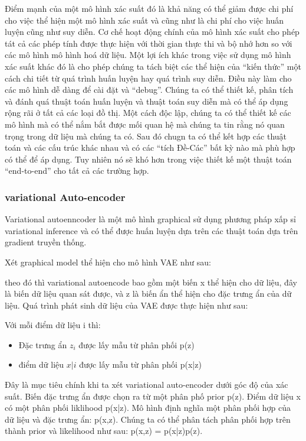         Điểm mạnh của một mô hình xác suất đó là khả năng có thể giảm được chi phí cho việc thể hiện một mô hình xác suất và cũng như là chi phí cho việc huấn luyện cũng như suy diễn. Cơ chế hoạt động chính của mô hình xác suất cho phép tát cả các phép tính được thực hiện với thời gian thực thi và bộ nhớ hơn so với các mô hình mô hình hoá dữ liệu. Một lợi ích khác trong việc sử dụng mô hình xác suất khác đó là cho phép chúng ta tách biệt các thể hiện của ``kiến thức'' một cách chi tiết từ quá trình huấn luyện hay quá trình suy diễn. Điều này làm cho các mô hình dễ dàng để cài đặt và ``debug''. Chúng ta có thể thiết kế, phân tích và đánh quá thuật toán huấn luyện và thuật toán suy diễn mà có thể áp dụng rộng rãi ở tất cả các loại đồ thị. Một cách độc lập, chúng ta có thể thiết kế các mô hình mà có thể nắm bắt được mối quan hệ mà chúng ta tin rằng nó quan trọng trong dữ liệu mà chúng ta có. Sau đó chugn ta có thể kết hợp các thuật toán và các cấu trúc khác nhau và có các ``tích Đề-Các'' bất kỳ nào mà phù hợp có thể để áp dụng. Tuy nhiên nó sẽ khó hơn trong việc thiết kế một thuật toán ``end-to-end'' cho tất cả các trường hợp.
        \subsubsection{variational Auto-encoder}
        Variational autoenncoder là một mô hình graphical sử dụng phương pháp xấp sỉ variational inference và có thể được huấn luyện dựa trên các thuật toán dựa trên gradient truyền thống.
        
        Xét graphical model thể hiện cho mô hình VAE như sau:

        theo đó thì variational autoencode bao gồm một biến x thể hiện cho dữ liệu, đây là biến dữ liệu quan sát được, và z là biến ẩn thể hiện cho đặc trưng ẩn của dữ liệu. 
        Quá trình phát sinh dữ liệu của VAE được thực hiện như sau: 
        
        Với mỗi điểm dữ liệu i thì: 
        \begin{itemize}
            \item Đặc trưng ẩn $z_i$ được lấy mẫu từ phân phối p(z)
            \item điểm dữ liệu $x|i$ được lấy mẫu từ phân phối p(x|z)
        \end{itemize}
        Đây là mục tiêu chính khi ta xét variational auto-encoder dưới góc độ của xác suất.
        Biến đặc trưng ẩn được chọn ra từ một phân phố prior p(z). Điểm dữ liệu x có một phân phối liklihood p(x|z).
        Mô hình định nghĩa một phân phối hợp của dữ liệu và đặc trưng ẩn: p(x,z). 
        Chúng ta có thể phân tách phân phối hợp trên thành prior và likelihood như sau: p(x,z) = p(x|z)p(z).
        
